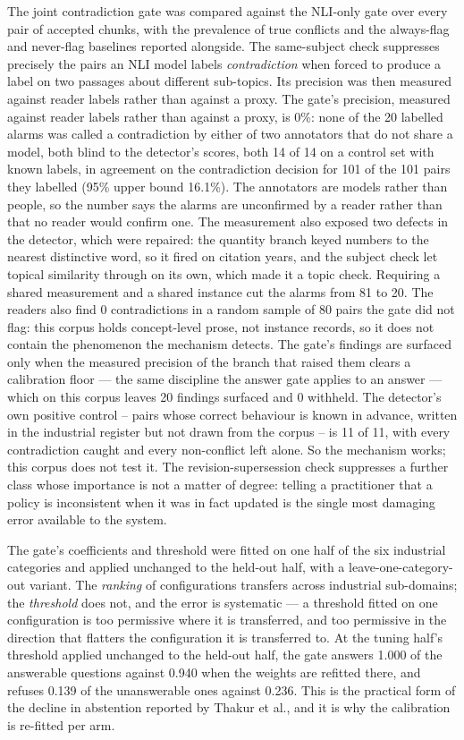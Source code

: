 \documentclass[conference]{IEEEtran}
\begin{document}
The joint contradiction gate was compared against the NLI-only gate over every
pair of accepted chunks, with the prevalence of true conflicts and the
always-flag and never-flag baselines reported alongside. The same-subject check
suppresses precisely the pairs an NLI model labels \emph{contradiction} when
forced to produce a label on two passages about different sub-topics. Its
precision was then measured against reader labels rather than against a proxy.
The gate's precision, measured against reader labels rather than against a proxy, is 0\%: none of the 20 labelled alarms was called a contradiction by either of two annotators that do not share a model, both blind to the detector's scores, both 14 of 14 on a control set with known labels, in agreement on the contradiction decision for 101 of the 101 pairs they labelled (95\% upper bound 16.1\%). The annotators are models rather than people, so the number says the alarms are unconfirmed by a reader rather than that no reader would confirm one. The measurement also exposed two defects in the detector, which were repaired: the quantity branch keyed numbers to the nearest distinctive word, so it fired on citation years, and the subject check let topical similarity through on its own, which made it a topic check. Requiring a shared measurement and a shared instance cut the alarms from 81 to 20. The readers also find 0 contradictions in a random sample of 80 pairs the gate did not flag: this corpus holds concept-level prose, not instance records, so it does not contain the phenomenon the mechanism detects. The
gate's findings are surfaced only when the measured precision of the branch
that raised them clears a calibration floor --- the same discipline the answer
gate applies to an answer --- which on this corpus leaves
20 findings surfaced and 0 withheld.
The detector's own positive control -- pairs whose correct behaviour is known in advance, written in the industrial register but not drawn from the corpus -- is 11 of 11, with every contradiction caught and every non-conflict left alone. So the mechanism works; this corpus does not test it. The
revision-supersession check suppresses a further class whose importance is not
a matter of degree: telling a practitioner that a policy is inconsistent when
it was in fact updated is the single most damaging error available to the
system.

The gate's coefficients and threshold were fitted on one half of the six
industrial categories and applied unchanged to the held-out half, with a
leave-one-category-out variant. The \emph{ranking} of configurations transfers
across industrial sub-domains; the \emph{threshold} does not, and the error is
systematic --- a threshold fitted on one configuration is too permissive where it
is transferred, and too permissive in the direction that flatters the
configuration it is transferred to. At the tuning half's threshold applied
unchanged to the held-out half, the gate answers
1.000 of the answerable questions against
0.940 when the weights are refitted there, and refuses
0.139 of the unanswerable ones against
0.236. This is the practical form of the decline in
abstention reported by Thakur et al., and it is why the calibration is
re-fitted per arm.
\end{document}
